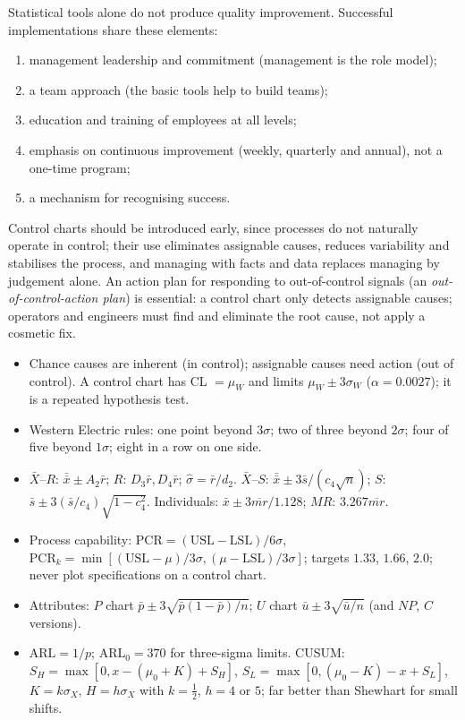Statistical tools alone do not produce quality improvement. Successful implementations share these elements:
\begin{enumerate}[label=(\arabic*)]
  \item management leadership and commitment (management is the role model);
  \item a team approach (the basic tools help to build teams);
  \item education and training of employees at all levels;
  \item emphasis on continuous improvement (weekly, quarterly and annual), not a one-time program;
  \item a mechanism for recognising success.
\end{enumerate}
Control charts should be introduced early, since processes do not naturally operate in control; their use eliminates assignable causes, reduces variability and stabilises the process, and managing with facts and data replaces managing by judgement alone. An action plan for responding to out-of-control signals (an \emph{out-of-control-action plan}) is essential: a control chart only detects assignable causes; operators and engineers must find and eliminate the root cause, not apply a cosmetic fix.

\begin{summarybox}
\begin{itemize}
  \item Chance causes are inherent (in control); assignable causes need action (out of control). A control chart has CL $=\mu_W$ and limits $\mu_W\pm3\sigma_W$ ($\alpha=0.0027$); it is a repeated hypothesis test.
  \item Western Electric rules: one point beyond $3\sigma$; two of three beyond $2\sigma$; four of five beyond $1\sigma$; eight in a row on one side.
  \item $\bar{X}$--$R$: $\bar{\bar{x}}\pm A_2\bar{r}$; $R$: $D_3\bar{r},D_4\bar{r}$; $\hat\sigma=\bar{r}/d_2$. $\bar{X}$--$S$: $\bar{\bar{x}}\pm3\bar{s}/(c_4\sqrt n)$; $S$: $\bar{s}\pm3(\bar{s}/c_4)\sqrt{1-c_4^2}$. Individuals: $\bar{x}\pm3\overline{mr}/1.128$; $MR$: $3.267\overline{mr}$.
  \item Process capability: $\mathrm{PCR}=(\mathrm{USL}-\mathrm{LSL})/6\sigma$, $\mathrm{PCR}_k=\min[(\mathrm{USL}-\mu)/3\sigma,(\mu-\mathrm{LSL})/3\sigma]$; targets $1.33$, $1.66$, $2.0$; never plot specifications on a control chart.
  \item Attributes: $P$ chart $\bar{p}\pm3\sqrt{\bar{p}(1-\bar{p})/n}$; $U$ chart $\bar{u}\pm3\sqrt{\bar{u}/n}$ (and $NP$, $C$ versions).
  \item $\mathrm{ARL}=1/p$; $\mathrm{ARL}_0=370$ for three-sigma limits. CUSUM: $S_H=\max[0,x-(\mu_0+K)+S_H]$, $S_L=\max[0,(\mu_0-K)-x+S_L]$, $K=k\sigma_X$, $H=h\sigma_X$ with $k=\frac12$, $h=4$ or $5$; far better than Shewhart for small shifts.
\end{itemize}
\end{summarybox}

